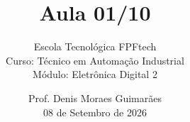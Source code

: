 
\title{Aula 01/10}

\subtitle{\texorpdfstring{%
Escola Tecnológica FPFtech\\[0.3cm]
Curso: Técnico em Automação Industrial\\[0.3cm]
Módulo: Eletrônica Digital 2
}{Escola Tecnológica FPFtech — Curso: Técnico em Automação Industrial — Módulo: Eletrônica Digital 2}}

\author{\texorpdfstring{%
Prof. Denis Moraes Guimarães\\
\small 08 de Setembro de 2026
}{Prof. Denis Moraes Guimarães}}

\date{}
